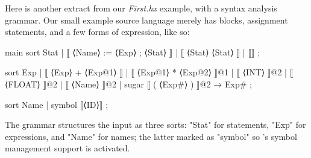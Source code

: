 \documentclass[11pt]{article} %
\begin{document}
\begin{example}\label{ex:syntax}
  Here is another extract from our \emph{First.hx} example, with a syntax analysis grammar. Our
  small example source language merely has blocks, assignment statements, and a few forms of
  expression, like so:
  \begin{hacs}[xleftmargin=\parindent,xrightmargin=2em,numbers=right]
main sort Stat  | ⟦ ⟨Name⟩ := ⟨Exp⟩ ; ⟨Stat⟩ ⟧
                | ⟦ { ⟨Stat⟩ } ⟨Stat⟩ ⟧
                | ⟦⟧ ;

sort Exp  | ⟦ ⟨Exp⟩ + ⟨Exp@1⟩ ⟧
          | ⟦ ⟨Exp@1⟩ * ⟨Exp@2⟩ ⟧@1
          | ⟦ ⟨INT⟩ ⟧@2
          | ⟦ ⟨FLOAT⟩ ⟧@2
          | ⟦ ⟨Name⟩ ⟧@2
          | sugar ⟦ ( ⟨Exp#⟩ ) ⟧@2 → Exp# ;

sort Name  | symbol ⟦⟨ID⟩⟧ ;
  \end{hacs}
  The grammar structures the input as three sorts: "Stat" for statements, "Exp" for expressions, and
  "Name" for names; the latter marked as "symbol" so \HAX's symbol management support is activated.
\end{example}
\end{document}
